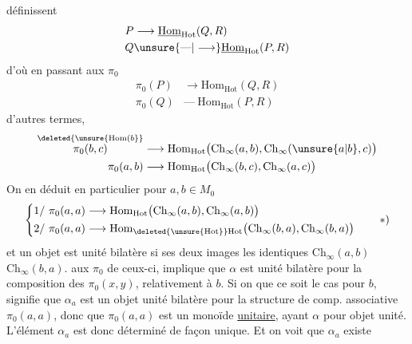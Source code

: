 définissent
\[
\begin{aligned}
P&\longrightarrow\underline{\mathrm{Hom}}_{\mathrm{Hot}}(Q,R)\\
Q&\unsure{\text{---}|\longrightarrow}\underline{\mathrm{Hom}}_{\mathrm{Hot}}(P,R)
\end{aligned}
\]
d'où en passant aux $\pi_0$
\[
\begin{aligned}
\pi_0(P)&\longrightarrow\mathrm{Hom}_{\mathrm{Hot}}(Q,R)\\
\pi_0(Q)&\text{---}\ \mathrm{Hom}_{\mathrm{Hot}}(P,R)
\end{aligned}
\]
 d'autres termes,
\[
\begin{aligned}
\overset{\deleted{\unsure{\mathrm{Hom}(b}}}{\pi_0(b,c)}&\longrightarrow\mathrm{Hom}_{\mathrm{Hot}}\bigl(\mathrm{Ch}_{\infty}(a,b),\mathrm{Ch}_{\infty}(\unsure{a|b},c)\bigr)\\
\pi_0(a,b)&\longrightarrow\mathrm{Hom}_{\mathrm{Hot}}\bigl(\mathrm{Ch}_{\infty}(b,c),\mathrm{Ch}_{\infty}(a,c)\bigr)
\end{aligned}
\]
    On en déduit en particulier pour $a,b\in M_0$
\[
\left\{\begin{aligned}
1/\ \pi_0(a,a)&\longrightarrow\mathrm{Hom}_{\mathrm{Hot}}\bigl(\mathrm{Ch}_{\infty}(a,b),\mathrm{Ch}_{\infty}(a,b)\bigr)\\
2/\ \pi_0(a,a)&\longrightarrow\mathrm{Hom}_{\deleted{\unsure{\mathrm{Hot}}}\mathrm{Hot}}\bigl(\mathrm{Ch}_{\infty}(b,a),\mathrm{Ch}_{\infty}(b,a)\bigr)
\end{aligned}\right.\tag*{$*)$}
\]
et un objet  est unité bilatère si ses deux images  les   identiques  $\mathrm{Ch}_{\infty}(a,b)$  $\mathrm{Ch}_{\infty}(b,a)$.  aux $\pi_0$  de ceux-ci,  implique que $\alpha$ est unité bilatère pour la composition  des $\pi_0(x,y)$, relativement à $b$. Si on  que ce soit le cas pour \uline{ $b$},  signifie  que $\alpha_a$ est un objet unité bilatère pour la structure de comp. associative   $\pi_0(a,a)$, donc que $\pi_0(a,a)$ est un monoïde \uline{unitaire}, ayant $\alpha$ pour objet unité. L'élément $\alpha_a$ est donc déterminé de façon unique.  Et on voit que $\alpha_a$ existe

